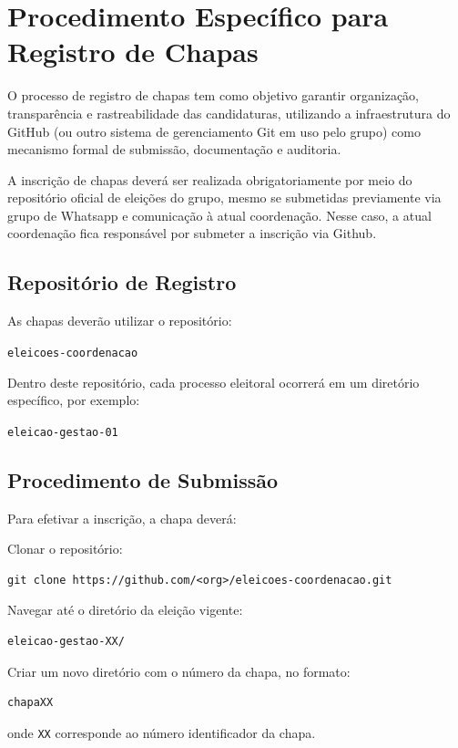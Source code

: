 \documentclass[
  12pt,          %
  a4paper,       %
  oneside,       %
  brazil         %
]{article}
\begin{document}
\section{Procedimento Específico para Registro de Chapas}

O processo de registro de chapas tem como objetivo garantir organização, transparência e rastreabilidade das candidaturas, 
utilizando a infraestrutura do GitHub (ou outro sistema de gerenciamento Git em uso pelo grupo) como mecanismo formal de submissão, documentação e auditoria. 

A inscrição de chapas deverá ser realizada obrigatoriamente por meio do repositório oficial de eleições do grupo, mesmo se submetidas previamente
via grupo de Whatsapp e comunicação à atual coordenação. Nesse caso, a atual coordenação fica responsável por submeter a inscrição via Github.

\subsection{Repositório de Registro}

As chapas deverão utilizar o repositório:

\begin{conduta}
	\item \texttt{eleicoes-coordenacao}
\end{conduta}

Dentro deste repositório, cada processo eleitoral ocorrerá em um diretório específico, por exemplo:

\begin{conduta}
	\item \texttt{eleicao-gestao-01}
\end{conduta}

\subsection{Procedimento de Submissão}

Para efetivar a inscrição, a chapa deverá:

\begin{numerado}
	\item Clonar o repositório:
	\begin{lstlisting}
git clone https://github.com/<org>/eleicoes-coordenacao.git
    \end{lstlisting}
	\item Navegar até o diretório da eleição vigente:
	\begin{lstlisting}
eleicao-gestao-XX/
    \end{lstlisting}
	\item Criar um novo diretório com o número da chapa, no formato:
	\begin{lstlisting}
chapaXX
    \end{lstlisting}
	onde \texttt{XX} corresponde ao número identificador da chapa.
\end{numerado}
\end{document}
